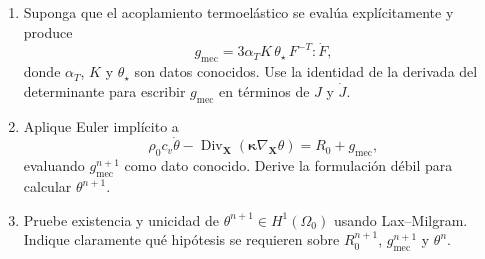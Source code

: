 \documentclass[11pt]{article}
\DeclareMathOperator{\Div}{Div}
\begin{document}
\begin{enumerate}[label=\textbf{\arabic*.}, leftmargin=*]
\begin{enumerate}[label=(\alph*), leftmargin=*]
    \item Suponga que el acoplamiento termoel\'astico se eval\'ua expl\'icitamente y produce
    \begin{equation*}
        g_{\mathrm{mec}}
        =3\alpha_TK\,\theta_\star\,F^{-T}:\dot F,
    \end{equation*}
    donde $\alpha_T$, $K$ y $\theta_\star$ son datos conocidos. Use la identidad de la derivada del determinante para escribir $g_{\mathrm{mec}}$ en t\'erminos de $J$ y $\dot J$.

    \item Aplique Euler impl\'icito a
    \begin{equation*}
        \rho_0c_v\dot\theta-
        \Div_{\bm X}\left(\bm\kappa\nabla_{\bm X}\theta\right)
        =R_0+g_{\mathrm{mec}},
    \end{equation*}
    evaluando $g_{\mathrm{mec}}^{n+1}$ como dato conocido. Derive la formulaci\'on d\'ebil para calcular $\theta^{n+1}$.

    \item Pruebe existencia y unicidad de $\theta^{n+1}\in H^1(\Omega_0)$ usando Lax--Milgram. Indique claramente qu\'e hip\'otesis se requieren sobre $R_0^{n+1}$, $g_{\mathrm{mec}}^{n+1}$ y $\theta^n$.
\end{enumerate}

\end{enumerate}
\end{document}
